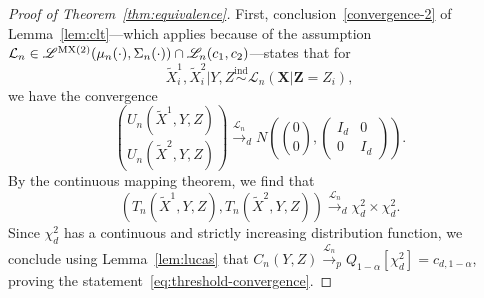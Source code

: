 \documentclass[12pt]{article}
\theoremstyle{definition}
\theoremstyle{remark}
\newcommand{\prx}{\bm X}
\newcommand{\prz}{\bm Z}
\newcommand{\srz}{Z}
\newcommand{\srxk}{\widetilde X}
\newcommand{\sry}{Y}
\begin{document}
\begin{proof}[Proof of Theorem~\ref{thm:equivalence}]
	
	First, conclusion~\eqref{convergence-2} of Lemma~\ref{lem:clt}---which applies because of the assumption $\mathcal L_n \in \mathscr L^{\textnormal{MX(2)}}(\mu_n(\cdot), \Sigma_n(\cdot)) \cap \mathscr L_n(c_1, c_2)$---states that for 
	\[
	\srxk^1_i, \srxk^2_i|\sry,\srz \overset{\text{ind}}\sim {\mathcal L_n(\prx|\prz = \srz_i)}, 
	\]
	we have the convergence
	\begin{equation}
		{U_n(\srxk^1, \sry, \srz) \choose U_n(\srxk^2, \sry, \srz)} \overset{\mathcal L_n}\rightarrow_d N\left({0 \choose 0},
		\begin{pmatrix}
			I_d & 0 \\
			0 & I_d
		\end{pmatrix}
		\right).
	\end{equation}
	By the continuous mapping theorem, we find that 
	\begin{equation}
		(T_n(\srxk^1, \sry, \srz), T_n(\srxk^2, \sry, \srz)) \overset{\mathcal L_n}\rightarrow_d  \chi^2_d \times \chi^2_d. 
	\end{equation}
	Since $\chi^2_d$ has a continuous and strictly increasing distribution function, we conclude using Lemma~\ref{lem:lucas} that $C_n(\sry,\srz)  \overset{\mathcal L_n}\rightarrow_p Q_{1-\alpha}[\chi^2_d] =  c_{d,1-\alpha}$, proving the statement~\eqref{eq:threshold-convergence}.
	

\end{proof}
\end{document}
